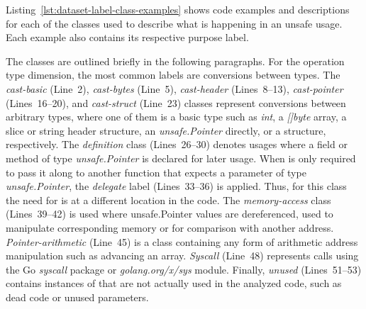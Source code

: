 Listing~\ref{lst:dataset-label-class-examples} shows code examples and descriptions for each of the classes used to
describe what is happening in an unsafe usage.
Each example also contains its respective purpose label.



The classes are outlined briefly in the following paragraphs.
For the \unsafe{} operation type dimension, the most common labels are conversions between types.
The \textit{cast-basic} (Line~2), \textit{cast-bytes} (Line~5), \textit{cast-header} (Lines~8--13),
\textit{cast-pointer} (Lines~16--20), and \textit{cast-struct} (Line~23) classes represent conversions between arbitrary
types, where one of them is a basic type such as \textit{int}, a \textit{[]byte} array, a slice or string header
structure, an \textit{unsafe.Pointer} directly, or a structure, respectively.
The \textit{definition} class (Lines~26--30) denotes usages where a field or method of type \textit{unsafe.Pointer} is
declared for later usage.
When \unsafe{} is only required to pass it along to another function that expects a parameter of type
\textit{unsafe.Pointer}, the \textit{delegate} label (Lines~33--36) is applied.
Thus, for this class the need for \unsafe{} is at a different location in the code.
The \textit{memory-access} class (Lines~39--42) is used where unsafe.Pointer values are dereferenced, used to manipulate
corresponding memory or for comparison with another address.
\textit{Pointer-arithmetic} (Line~45) is a class containing any form of arithmetic address manipulation such as
advancing an array.
\textit{Syscall} (Line~48) represents calls using the Go \textit{syscall} package or \textit{golang.org/x/sys} module.
Finally, \textit{unused} (Lines~51--53) contains instances of \unsafe{} that are not actually used in the analyzed code,
such as dead code or unused parameters.


